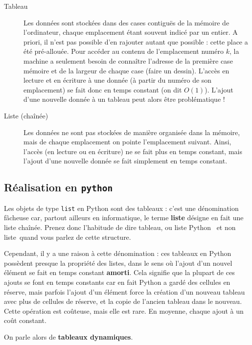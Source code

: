 \begin{description}
  \item[Tableau] Les données sont stockées dans des cases contiguës de la mémoire de l'ordinateur, chaque emplacement étant souvent indicé par un entier. 
    A priori, il n'est pas possible d'en rajouter autant que possible : cette place a été pré-allouée. 
    Pour accéder au contenu de l'emplacement numéro $k$, la machine a seulement besoin de connaître 
l'adresse de la première case mémoire et de la largeur de chaque case (faire un dessin). 
    L'accès en lecture et en écriture à une donnée (à partir du numéro de son emplacement) se fait donc en temps constant (on dit $O(1)$).
    L'ajout d'une nouvelle donnée à un tableau peut alors être problématique !
  \item[Liste (chaînée)] Les données ne sont pas stockées de manière organisée dans la mémoire, 
mais de chaque emplacement on pointe l'emplacement suivant. 
    Ainsi, l'accès (en lecture ou en écriture) ne se fait plus en temps constant, mais l'ajout d'une nouvelle donnée se fait simplement en temps constant. 
\end{description}

\subsection{Réalisation en \texttt{python}}

Les objets de type \texttt{list} en Python sont des tableaux : c'est une 
dénomination fâcheuse car, partout ailleurs en informatique, le terme
\textbf{liste} désigne en fait une liste chaînée. Prenez donc
l'habitude de dire \og tableau\fg, ou \og liste Python \fg\ et non \og liste\fg\ quand vous parlez de cette
structure.

Cependant, il y a une raison à cette dénomination : ces tableaux en Python possèdent presque 
la propriété des listes, dans le sens où l'ajout d'un nouvel élément se fait en temps constant 
\textbf{amorti}. Cela signifie que la plupart de ces ajouts se font en temps constants car en fait 
Python a \og gardé des cellules en réserve\fg, mais parfois l'ajout d'un élément force la création 
d'un nouveau tableau avec plus de cellules de réserve, et la copie de l'ancien tableau dans le 
nouveau. Cette opération est coûteuse, mais elle 
est rare. En moyenne, chaque ajout à un coût constant.

On parle alors de \textbf{tableaux dynamiques}.

